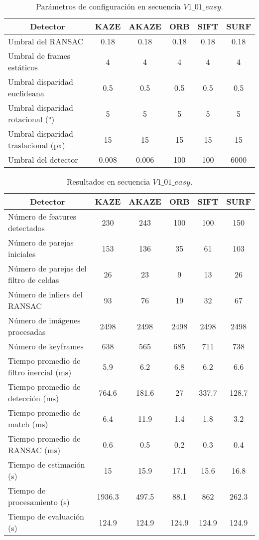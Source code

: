 \begin{table}[H]
	\caption{Parámetros de configuración en secuencia $V1\_01\_easy$.}
	\begin{tabular}{|l|c|c|c|c|c|}
		\hline
		\multicolumn{1}{|c|}{\textbf{Detector}} & \textbf{KAZE} & \textbf{AKAZE} & \textbf{ORB} & \textbf{SIFT} & \textbf{SURF} \\ \hline
		Umbral del RANSAC & 0.18 & 0.18 & 0.18 & 0.18 & 0.18 \\ \hline
		Umbral de frames estáticos & 4 & 4 & 4 & 4 & 4 \\ \hline
		Umbral disparidad euclideana & 0.5 & 0.5 & 0.5 & 0.5 & 0.5 \\ \hline
		Umbral disparidad rotacional (°) & 5 & 5 & 5 & 5 & 5 \\ \hline
		Umbral disparidad traslacional (px) & 15 & 15 & 15 & 15 & 15 \\ \hline
		Umbral del detector & 0.008 & 0.006 & 100 & 100 & 6000 \\ \hline
	\end{tabular}
	\label{Tabla/Parametros/V1_01_easy}
\end{table}

\begin{table}[H]
	\caption{Resultados en secuencia $V1\_ 01\_ easy$.}
	\begin{tabular}{|l|c|c|c|c|c|}
		\hline
		\multicolumn{1}{|c|}{\textbf{Detector}} & \textbf{KAZE} & \textbf{AKAZE} & \textbf{ORB} & \textbf{SIFT} & \textbf{SURF} \\ \hline
		Número de features detectados & 230 & 243 & 100 & 100 & 150 \\ \hline
		Número de parejas iniciales & 153 & 136 & 35 & 61 & 103 \\ \hline
		Número de parejas del filtro de celdas & 26 & 23 & 9 & 13 & 26 \\ \hline
		Número de inliers del RANSAC & 93 & 76 & 19 & 32 & 67 \\ \hline
		Número de imágenes procesadas & 2498 & 2498 & 2498 & 2498 & 2498 \\ \hline
		Número de keyframes & 638 & 565 & 685 & 711 & 738 \\ \hline
		Tiempo promedio de filtro inercial (ms) & 5.9 & 6.2 & 6.8 & 6.2 & 6.6 \\ \hline
		Tiempo promedio de detección  (ms) & 764.6 & 181.6 & 27 & 337.7 & 128.7 \\ \hline
		Tiempo promedio de match (ms) & 6.4 & 11.9 & 1.4 & 1.8 & 3.2 \\ \hline
		Tiempo promedio de RANSAC (ms) & 0.6 & 0.5 & 0.2 & 0.3 & 0.4 \\ \hline
		Tiempo de estimación (s) & 15 & 15.9 & 17.1 & 15.6 & 16.8 \\ \hline
		Tiempo de  procesamiento (s) & 1936.3 & 497.5 & 88.1 & 862 & 262.3 \\ \hline
		Tiempo de evaluación (s) & 124.9 & 124.9 & 124.9 & 124.9 & 124.9 \\ \hline
	\end{tabular}
	\label{Tabla/Resultados/V1_01_easy}
\end{table}


